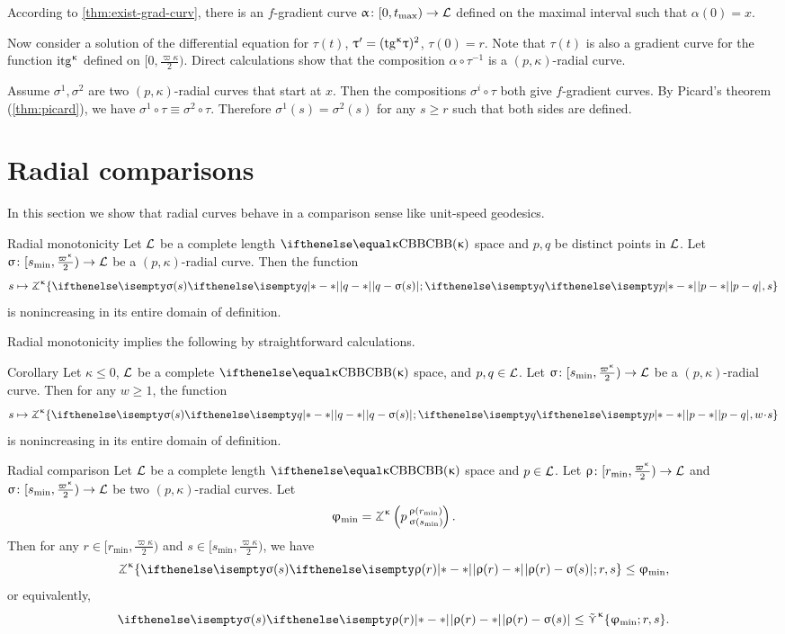 According to \ref{thm:exist-grad-curv}, there is an $f$-gradient curve $\alpha\:[0,t_{\max})\to \spc{L}$ defined on the maximal interval such that $\alpha(0)=x$.

Now consider a solution of the  differential equation for  $\tau(t)$, $\tau'\z=(\tg\kappa\tau)^2$, $\tau(0)=r$. 
Note that $\tau(t)$ is also a gradient curve  for the function $\mathrm{itg}^{\upkappa}$ defined on $[0,\tfrac{\varpi\kappa}2)$.
Direct calculations show that the composition $\alpha\circ\tau^{-1}$ 
is a $(p,\kappa)$-radial curve.

 Assume $\sigma^1,\sigma^2$ are two $(p,\kappa)$-radial curves that start at $x$.
Then the compositions $\sigma^i\circ\tau$ both give $f$-gradient curves.
By Picard's theorem (\ref{thm:picard}), we have
$\sigma^1\circ\tau 
\equiv 
\sigma^2\circ\tau$.
Therefore $\sigma^1(s)=\sigma^2(s)$ 
for any $s\ge r$ such that both sides are defined.
\qeds

\section{Radial comparisons}\label{sec:Radial comparisons}

In this section we show that radial curves behave in a comparison sense
 like unit-speed geodesics.

\begin{thm}{Radial monotonicity}\label{rad-mon}
Let $\mathcal{L}$ be a complete length $\Alex{\kappa}$ space and
$p, q$ be distinct points in $\mathcal{L}$.
Let $\sigma\:  [s_{\min},\tfrac{\varpi\kappa}2)\to \spc{L}$
be a $(p,\kappa)$-radial curve.
Then the function 
\[s\mapsto 
\tangle\mc\kappa\{
\dist{q}{\sigma(s)}{};
\dist{p}{q}{},
s
\}\]
is nonincreasing in its entire domain of definition.
\end{thm}

Radial monotonicity implies the following by straightforward calculations.

\begin{thm}{Corollary}\label{cor:rad-comp}
Let $\kappa\le0$,
$\mathcal{L}$ be a complete $\Alex\kappa$ space,
and $p, q\in \spc{L}$.
Let $\sigma\:[s_{\min},\tfrac{\varpi\kappa}2)\to \spc{L}$ be a $(p,\kappa)$-radial curve.
Then for any $w\ge 1$, 
the function
\[
s\mapsto \tangle\mc\kappa\{\dist{q}{\sigma(s)}{};\dist{p}{q}{},w\cdot s\}
\]
is nonincreasing in its entire domain of definition.
\end{thm}


\begin{thm}{Radial comparison}\label{rad-comp}
Let $\mathcal{L}$ be a complete length $\Alex{\kappa}$ space 
and $p\in \spc{L}$.
Let $\rho\:  [r_{\min},\tfrac{\varpi\kappa}2)\to \spc{L}$
and    $\sigma\:[s_{\min},\tfrac{\varpi\kappa}2)\to \spc{L}$
be two $(p,\kappa)$-radial curves.
Let
\[\phi_{\min}=\angkk\kappa p{\rho(r_{\min})}{\sigma(s_{\min})}.
\]
Then for any $r\in[r_{\min},\tfrac{\varpi\kappa}2)$ and  $s\in[s_{\min},\tfrac{\varpi\kappa}2)$,
we have
\[
\tangle\mc\kappa\{\dist{\rho(r)}{\sigma(s)}{};r,s\}
\le \phi_{\min},
\]
or equivalently,
\[
\dist{\rho(r)}{\sigma(s)}{}
\le \side\kappa\{\phi_{\min};r,s\}.
\]

\end{thm}


